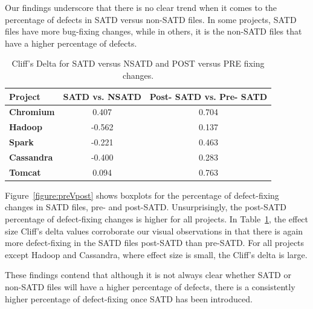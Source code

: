 Our findings underscore that there is no clear trend when it comes to the percentage of defects in SATD versus non-SATD files. In some projects, SATD files have more bug-fixing changes, while in others, it is the non-SATD files that have a higher percentage of defects.

\begin{table}[tb]
	\setlength{\tabcolsep}{.7\tabcolsep}
	\centering
	\caption{Cliff's Delta for SATD versus NSATD and POST versus PRE fixing changes.}
	\begin{tabular}{l|c|c}
		\hline
		\textbf{Project}   & {\bf SATD vs. NSATD} & {\bf Post- SATD vs. Pre- SATD} \\ \hline
		\textbf{Chromium}  & 0.407          & 0.704        \\ \hline
		\textbf{Hadoop}    & -0.562         & 0.137        \\ \hline
		\textbf{Spark}     & -0.221         & 0.463        \\ \hline
		\textbf{Cassandra} & -0.400         & 0.283        \\ \hline
		\textbf{Tomcat}    & 0.094          & 0.763        \\ \hline
	\end{tabular}
	\label{table:cliff_deltas_RQ1}
\end{table}

 Figure~\ref{figure:preVpost} shows boxplots for the percentage of defect-fixing changes in SATD files, pre- and post-SATD. Unsurprisingly, the post-SATD percentage of defect-fixing changes is higher for all projects. In Table~\ref{table:cliff_deltas_RQ1}, the effect size Cliff's delta values corroborate our visual observations in that there is again more defect-fixing in the SATD files post-SATD than pre-SATD. For all projects except Hadoop and Cassandra, where effect size is small, the Cliff's delta is large.


These findings contend that although it is not always clear whether SATD or non-SATD files will have a higher percentage of defects, there is a consistently higher percentage of defect-fixing once SATD has been introduced.



